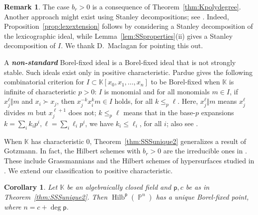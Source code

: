 \documentclass[12pt]{amsart}%
\newtheorem{corollary}[theorem]{Corollary}
\theoremstyle{definition}%
\newtheorem{remark}[theorem]{Remark}
\DeclareMathOperator{\hilb}{Hilb}%
\DeclareMathOperator{\PP}{\mathbb{P}}%
\newcommand{\hp}{\mathsf{p}}%
\newcommand{\kk}{\mathbb{K}}%
\DeclareMathOperator{\lexg}{\succ}%
\begin{document}
\begin{remark}
  The case $b_r > 0$ is a consequence of
  Theorem~\ref{thm:Kpolydegree}.  Another approach might exist using
  Stanley decompositions; see \cite{Maclagan--Smith--2005,
    Sturmfels--White--1991, Stanley--1982}.  Indeed,
  Proposition~\ref{prop:lexextension} follows by considering a Stanley
  decomposition of the lexicographic ideal, while
  Lemma~\ref{lem:SSproperties}(ii) gives a Stanley decomposition of
  $I$.  We thank D.~Maclagan for pointing this out.
\end{remark}

A \emph{\bfseries non-standard} Borel-fixed ideal is a Borel-fixed
ideal that is not strongly stable.  Such ideals exist only in positive
characteristic.  Pardue \cite[Chapter~2]{Pardue--1994} gives the
following combinatorial criterion for $I \subset \kk[x_0, x_1, \ldots,
  x_n]$ to be Borel-fixed when $\kk$ is infinite of characteristic $p
> 0$: $I$ is monomial and for all monomials $m \in I$, if $x_j^{\ell}
\Vert m$ and $x_i \lexg x_j$, then $x_j^{-k} x_i^k m \in I$ holds, for
all $k \le_p \ell$.  Here, $x_j^{\ell} \Vert m$ means $x_j^{\ell}$
divides $m$ but $x_j^{\ell+1}$ does not; $k \le_p \ell$ means that in
the base-$p$ expansions $k = \sum_i k_i p^i, \ell = \sum_i \ell_i
p^i$, we have $k_i \le \ell_i$, for all $i$; also see
\cite[\S~15.9.3]{Eisenbud--1995}.

When $\kk$ has characteristic $0$, Theorem~\ref{thm:SSSunique2}
generalizes a result of Gotzmann.  In fact, the Hilbert schemes with
$b_r > 0$ are the irreducible ones in \cite{Gotzmann--1989}.  These
include Grassmannians and the Hilbert schemes of hypersurfaces studied
in \cite{Aadlandsvik--1985}.  We extend our classification to positive
characteristic.

\begin{corollary}
  \label{cor:SSSunique}
  Let $\kk$ be an algebraically closed field and $\hp, c$ be as in
  Theorem~\ref{thm:SSSunique2}.  Then $\hilb^{\hp}(\PP^n)$ has a
  unique Borel-fixed point, where $n = c + \deg \hp$.
\end{corollary}
\end{document}
